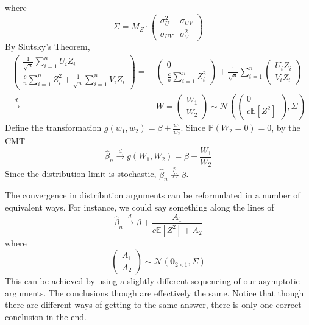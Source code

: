where
\[
  \Sigma = M_{Z} \cdot \left( \begin{array}{cc}
    \sigma_{U}^{2} & \sigma_{U V} \\
    \sigma_{U V} & \sigma_{V}^{2}
  \end{array} \right)
\]
By Slutsky's Theorem,
\begin{align*}
  \left( \begin{array}{c}
    \frac{1}{\sqrt{n}} \sum_{i = 1}^{n} U_{i} Z_{i} \\
    \frac{c}{n} \sum_{i = 1}^{n} Z_{i}^{2} + \frac{1}{\sqrt{n}} \sum_{i = 1}^{n}
    V_{i} Z_{i}
  \end{array} \right) = & \ \left( \begin{array}{c}
    0 \\
    \frac{c}{n} \sum_{i = 1}^{n} Z_{i}^{2}
  \end{array} \right) + \frac{1}{\sqrt{n}} \sum_{i = 1}^{n}
  \left( \begin{array}{c}
    U_{i} Z_{i} \\
    V_{i} Z_{i}
  \end{array} \right) \\
  \overset{d}{\to} & \ W = \left( \begin{array}{c}
    W_{1} \\
    W_{2}
  \end{array} \right) \sim \mathcal{N} \left( \left( \begin{array}{c}
      0 \\
      c \mathbb{E} \left[ Z^{2} \right]
  \end{array} \right), \Sigma \right)
\end{align*}
Define the transformation \(g \left( w_{1}, w_{2} \right) = \beta +
\frac{w_{1}}{w_{2}}\). Since \(\mathbb{P} \left( W_{2} = 0 \right) = 0\), by the
CMT
\[
  \widehat{\beta}_{n} \overset{d}{\to} g \left( W_{1}, W_{2} \right) = \beta +
  \frac{W_{1}}{W_{2}}
\]
Since the distribution limit is stochastic, \(\widehat{\beta}_{n}
\overset{p}{\not \to} \beta\).

\begin{remark*}
The convergence in distribution arguments can be reformulated in a number of
equivalent ways. For instance, we could say something along the lines of
\[
  \widehat{\beta}_{n} \overset{d}{\to} \beta + \frac{A_{1}}{c \mathbb{E} \left[
  Z^{2} \right] + A_{2}}
\]
where
\[
  \left( \begin{array}{c}
    A_{1} \\
    A_{2}
  \end{array} \right) \sim \mathcal{N} \left( \mathbf{0}_{2 \times 1}, \Sigma
  \right)
\]
This can be achieved by using a slightly different sequencing of our asymptotic
arguments. The conclusions though are effectively the same. Notice that though
there are different ways of getting to the same answer, there is only one
correct conclusion in the end.
\end{remark*}

